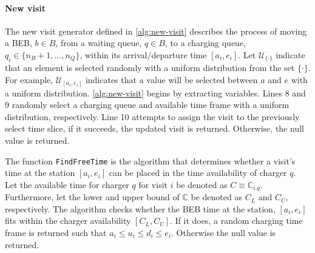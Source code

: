 \documentclass[ee,thesis]{usuthesis}
\newcommand{\C}{\mathbb{C}}                 %
\newcommand{\U}{\mathcal{U}}                %
\begin{document}
\paragraph{New visit}
\label{sec:sa-new-visit}
The new visit generator defined in \ref{alg:new-visit} describes the process of moving a BEB, \(b \in B\), from a waiting
queue, \(q \in B\), to a charging queue, \(q_i \in \{n_B + 1, ..., n_Q\}\), within its arrival/departure time \([a_i, e_i]\). Let
\(\U_{\{\cdot\}}\) indicate that an element is selected randomly with a uniform distribution from the set \(\{\cdot\}\). For
example, \(\U_{[a_i, e_i]}\) indicates that a value will be selected between \(a\) and \(e\) with a uniform distribution.
\ref{alg:new-visit} begins by extracting variables. Lines 8 and 9 randomly select a charging queue and available time
frame with a uniform distribution, respectively. Line 10 attempts to assign the visit to the previously select time
slice, if it succeeds, the updated visit is returned. Otherwise, the null value is returned.

The function \texttt{FindFreeTime} is the algorithm that determines whether a visit's time at the station \([a_i, e_i]\) can be placed
in the time availability of charger \(q\). Let the available time for charger \(q\) for visit \(i\) be denoted as \(C \equiv
\C_{i.q}\). Furthermore, let the lower and upper bound of \(\C\) be denoted as \(C_L\) and \(C_U\), respectively. The algorithm
checks whether the BEB time at the station, \([a_i, e_i]\) fits within the charger availability \([C_L, C_U]\). If it does,
a random charging time frame is returned such that \(a_i \le u_i \le d_i \le e_i\). Otherwise the null value is returned.
\end{document}
